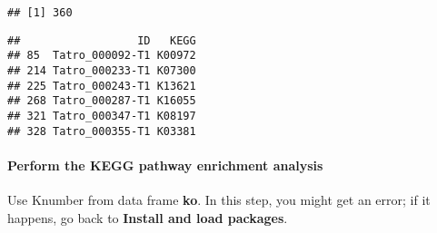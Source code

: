 \documentclass[
]{article}
\newenvironment{Shaded}{\begin{snugshade}}{\end{snugshade}}
\newcommand{\AttributeTok}[1]{\textcolor[rgb]{0.77,0.63,0.00}{#1}}
\newcommand{\CommentTok}[1]{\textcolor[rgb]{0.56,0.35,0.01}{\textit{#1}}}
\newcommand{\DecValTok}[1]{\textcolor[rgb]{0.00,0.00,0.81}{#1}}
\newcommand{\FloatTok}[1]{\textcolor[rgb]{0.00,0.00,0.81}{#1}}
\newcommand{\FunctionTok}[1]{\textcolor[rgb]{0.00,0.00,0.00}{#1}}
\newcommand{\NormalTok}[1]{#1}
\newcommand{\OtherTok}[1]{\textcolor[rgb]{0.56,0.35,0.01}{#1}}
\newcommand{\SpecialCharTok}[1]{\textcolor[rgb]{0.00,0.00,0.00}{#1}}
\newcommand{\StringTok}[1]{\textcolor[rgb]{0.31,0.60,0.02}{#1}}
\begin{document}
\begin{Shaded}
\end{Shaded}

\begin{verbatim}
## [1] 360
\end{verbatim}

\begin{Shaded}
\end{Shaded}

\begin{verbatim}
##                  ID   KEGG
## 85  Tatro_000092-T1 K00972
## 214 Tatro_000233-T1 K07300
## 225 Tatro_000243-T1 K13621
## 268 Tatro_000287-T1 K16055
## 321 Tatro_000347-T1 K08197
## 328 Tatro_000355-T1 K03381
\end{verbatim}

\hypertarget{perform-the-kegg-pathway-enrichment-analysis}{%
\paragraph{Perform the KEGG pathway enrichment
analysis}\label{perform-the-kegg-pathway-enrichment-analysis}}

Use Knumber from data frame \textbf{ko}. In this step, you might get an
error; if it happens, go back to \textbf{Install and load packages}.

\begin{Shaded}
\end{Shaded}
\end{document}
